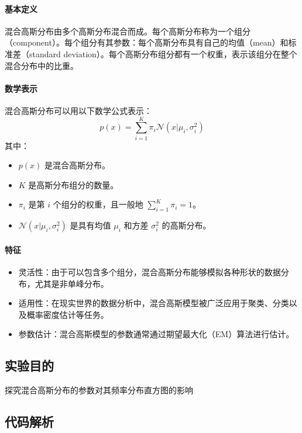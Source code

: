 \documentclass[a4paper]{article}
\begin{document}
\paragraph{基本定义}

混合高斯分布由多个高斯分布混合而成。每个高斯分布称为一个组分（component）。每个组分有其参数：每个高斯分布具有自己的均值（mean）和标准差（standard deviation）。每个高斯分布组分都有一个权重，表示该组分在整个混合分布中的比重。

\paragraph{数学表示}

混合高斯分布可以用以下数学公式表示：
\[ p(x) = \sum_{i=1}^{K} \pi_i \mathcal{N}(x | \mu_i, \sigma_i^2) \]
其中：
\begin{itemize}
  \item \( p(x) \) 是混合高斯分布。
  \item \( K \) 是高斯分布组分的数量。
  \item \( \pi_i \) 是第 \( i \) 个组分的权重，且一般地 \( \sum_{i=1}^{K} \pi_i = 1 \)。
  \item \( \mathcal{N}(x | \mu_i, \sigma_i^2) \) 是具有均值 \( \mu_i \) 和方差 \( \sigma_i^2 \) 的高斯分布。
\end{itemize}

\paragraph{特征}
\begin{itemize}
  \item 灵活性：由于可以包含多个组分，混合高斯分布能够模拟各种形状的数据分布，尤其是非单峰分布。
  \item 适用性：在现实世界的数据分析中，混合高斯模型被广泛应用于聚类、分类以及概率密度估计等任务。
  \item 参数估计：混合高斯模型的参数通常通过期望最大化（EM）算法进行估计。
\end{itemize}


\subsection{实验目的}
探究混合高斯分布的参数对其频率分布直方图的影响

\subsection{代码解析}
\end{document}
